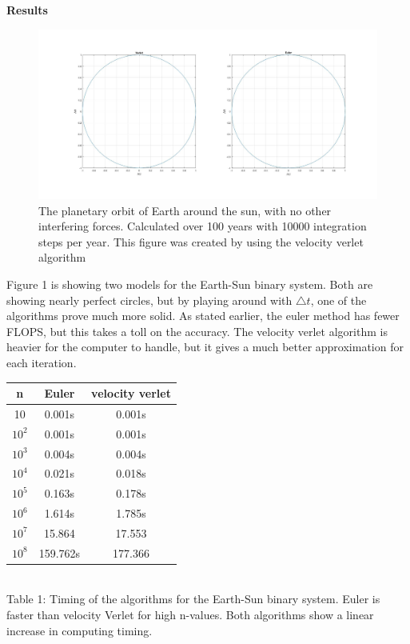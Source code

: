 \documentclass[10pt,a4paper]{article}
\begin{document}
\newpage
{\LARGE\bf
Results
}\\
\begin{figure} [H]  

\centerline{\includegraphics[scale=0.3]{FirstModel.jpg}}
\caption{The planetary orbit of Earth around the sun, with no other interfering forces. Calculated over 100 years with 10000 integration steps per year. This figure was created by using the velocity verlet algorithm}
\end{figure}

\noindent Figure 1 is showing  two models for the Earth-Sun binary system. Both are showing nearly perfect circles, but by playing around with $\bigtriangleup t$, one of the algorithms prove much more solid. As stated earlier, the euler method has fewer FLOPS, but this takes a toll on the accuracy. The velocity verlet algorithm is heavier for the computer to handle, but it gives a much better approximation for each iteration. \\ 

\begin{center}
\begin{tabular}{|c|c|c|}
\hline
  n  & Euler & velocity verlet\\
\hline
10        & 0.001s & 0.001s \\
\hline
$10^2$      & 0.001s & 0.001s \\
\hline
$10^3$      & 0.004s & 0.004s \\
\hline
$10^4$      & 0.021s & 0.018s \\
\hline
$10^5$      & 0.163s & 0.178s \\
\hline
$10^6$      & 1.614s & 1.785s \\
\hline
$10^7$      & 15.864 & 17.553 \\
\hline
$10^8$      & 159.762s & 177.366  \\
\hline
\end{tabular}\\
Table 1: Timing of the algorithms for the Earth-Sun binary system. Euler is faster than velocity Verlet for high n-values. Both algorithms show a linear increase in computing timing. 
\end{center}
\end{document}
